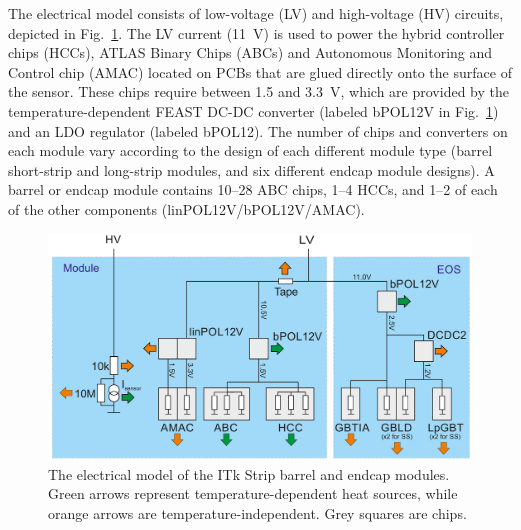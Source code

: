 
The electrical model consists of low-voltage (LV) and high-voltage (HV) circuits, depicted in
Fig.~\ref{electrical_model}. The LV current (11~V) is used to power the hybrid controller chips (HCCs),
ATLAS Binary Chips (ABCs) and Autonomous Monitoring and Control chip (AMAC) located on PCBs that are
glued directly onto the surface of the sensor.
These chips require between 1.5 and 3.3~V, which are provided by the temperature-dependent
FEAST DC-DC converter (labeled bPOL12V in Fig.~\ref{electrical_model}) and an LDO regulator (labeled bPOL12).
The number of chips and converters on each module vary according to the design of
each different module type (barrel short-strip and long-strip modules, and six different endcap
module designs).
A barrel or endcap module contains 10--28 ABC chips, 1--4 HCCs, and
1--2 of each of the other components (linPOL12V/bPOL12V/AMAC).

\begin{figure}[ht!]
\centering
\includegraphics[width=0.8\linewidth]{figures/electrical_model.pdf}
\caption{
The electrical model of the ITk Strip barrel and endcap modules. Green arrows represent temperature-dependent heat sources, while orange arrows are temperature-independent. Grey squares are chips.
}
\label{electrical_model}
\end{figure}



